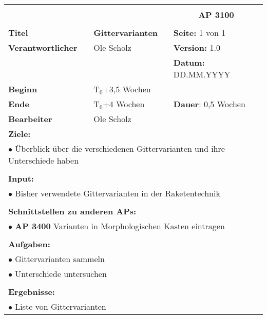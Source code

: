 \clearpage
\begin{table}[!h]
	\begin{center}
		\begin{tabular}{|p{35mm}||p{55mm}|p{50mm}||p{40mm}|}
			\hline
			\multicolumn{3}{|l||}{\textbf{}} & \multicolumn{1}{c|}{}\\
			\multicolumn{3}{|l||}{\textbf{}} & \multicolumn{1}{c|}{\textbf{AP 3100}}\\
			\multicolumn{3}{|l||}{\textbf{}} & \multicolumn{1}{c|}{}\\
			\hline\hline
			\textbf{Titel} & \multicolumn{2}{p{7cm}||}{\textbf{Gittervarianten}} 
			& \textbf{Seite:} 1 von 1\\
			\hline
			\textbf{Verantwortlicher} & \multicolumn{2}{l||}{Ole Scholz} & \textbf{Version:} 1.0\\
			\hline
			\multicolumn{3}{|l||}{} & \textbf{Datum:} DD.MM.YYYY\\
			\hline\hline
			\textbf{Beginn} & \multicolumn{2}{l||}{T$_0$+3,5 Wochen} & \\
			\hline
			\textbf{Ende} & \multicolumn{2}{l||}{T$_0$+4 Wochen} & \textbf{Dauer}: 0,5 Wochen\\
			\hline\hline
			\textbf{Bearbeiter} & \multicolumn{3}{l|}{Ole Scholz}\\
			\hline\hline
			\multicolumn{4}{|p{150mm}|}{\textbf{Ziele:}}\\
			\multicolumn{4}{|p{150mm}|}{$\bullet$ Überblick über die verschiedenen Gittervarianten und ihre Unterschiede haben}\\
			\multicolumn{4}{|p{150mm}|}{}\\
			\multicolumn{4}{|p{150mm}|}{\textbf{Input:}}\\
			\multicolumn{4}{|p{150mm}|}{$\bullet$ Bisher verwendete Gittervarianten in der Raketentechnik}\\
			\multicolumn{4}{|p{150mm}|}{}\\
			\multicolumn{4}{|p{150mm}|}{\textbf{Schnittstellen zu anderen APs:}}\\
			\multicolumn{4}{|p{150mm}|}{$\bullet$ \textbf{AP 3400} Varianten in Morphologischen Kasten eintragen}\\
			\multicolumn{4}{|p{150mm}|}{}\\
			\multicolumn{4}{|p{150mm}|}{\textbf{Aufgaben:}}\\
			\multicolumn{4}{|p{150mm}|}{$\bullet$ Gittervarianten sammeln}\\
			\multicolumn{4}{|p{150mm}|}{$\bullet$ Unterschiede untersuchen}\\
			\multicolumn{4}{|p{150mm}|}{}\\
			\multicolumn{4}{|p{150mm}|}{\textbf{Ergebnisse:}}\\
			\multicolumn{4}{|p{150mm}|}{$\bullet$ Liste von Gittervarianten}\\
			\hline
		\end{tabular}
	\end{center}
\end{table}

